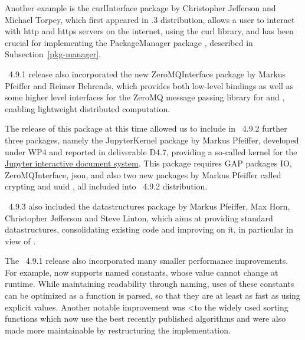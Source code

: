 Another example is the {\sf curlInterface} package \cite{curlInterface}
by Christopher Jefferson and Michael Torpey, which first appeared
in .3 distribution, allows a user to interact 
with http and https servers on the internet, using the {\sf curl} library, 
and has been crucial for implementing the {\sf PackageManager} package
\cite{PackageManager}, described in Subsection~\ref{pkg-manager}.

\GAP~4.9.1 release also incorporated the new {\sf ZeroMQInterface}
package
\cite{ZeroMQInterface} by Markus Pfeiffer and Reimer Behrends, which
provides both low-level bindings as well as some higher level interfaces
for the {\sf ZeroMQ} message passing library for \GAP and \HPCGAP, 
enabling lightweight distributed computation. 


The release of this package at this time allowed us to include in \GAP~4.9.2
further three packages, namely the {\sf JupyterKernel} package \cite{JupyterKernel} 
by Markus Pfeiffer, developed under WP4 and reported in deliverable D4.7,
providing a so-called kernel for the
\href{https://jupyter.org/}{Jupyter interactive document system}. This package
requires GAP packages {\sf IO}, {\sf ZeroMQInterface}, {\sf json},
and also two new packages by Markus Pfeiffer called
{\sf crypting} and {\sf uuid} \cite{crypting,uuid}, all included 
into \GAP~4.9.2 distribution.

\GAP~4.9.3 also included the {\sf datastructures} package \cite{datastructures}
by Markus Pfeiffer, Max Horn, Christopher Jefferson and Steve Linton, which aims 
at providing standard datastructures, consolidating existing code and improving 
on it, in particular in view of \HPCGAP.

The \GAP~4.9.1 release also incorporated many smaller performance improvements. For example,
\GAP now supports named constants, whose value cannot change 
at runtime. While maintaining readability through naming, uses of
these constants can be optimized as a function is parsed, so that they
are at least as fast as using explicit values. Another notable improvement was
<to the widely used  sorting functions which now use the best
recently published algorithms and were also made more maintainable by
restructuring the implementation.

